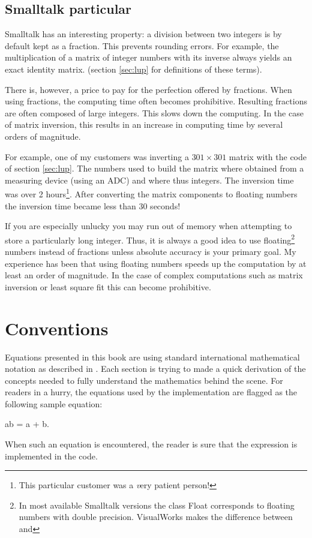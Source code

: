 \subsection{Smalltalk particular}
Smalltalk has an interesting property: a division between two
integers is by default kept as a fraction. This prevents rounding
errors. For example, the multiplication of a matrix of integer
numbers with its inverse always yields an exact identity matrix.
(\cf section \ref{sec:lup} for definitions of these terms).

There is, however, a price to pay for the perfection offered by
fractions. When using fractions, the computing time often becomes
prohibitive. Resulting fractions are often composed of large
integers. This slows down the computing. In the case of matrix
inversion, this results in an increase in computing time by
several orders of magnitude.

For example, one of my customers was inverting a $301\times 301$
matrix with the code of section \ref{sec:lup}. The numbers used to
build the matrix where obtained from a measuring device (using an
ADC) and where thus integers. The inversion time was over 2
hours\footnote{This particular customer was a {\textsl very} patient
person!}. After converting the matrix components to floating
numbers the inversion time became less than 30 seconds!

If you are especially unlucky you may run out of memory when
attempting to store a particularly long integer. Thus, it is
always a good idea to use floating\footnote{In most available
Smalltalk versions the class Float corresponds to floating numbers
with double precision. VisualWorks makes the difference between
 and } numbers instead of fractions unless
absolute accuracy is your primary goal. My experience has been
that using floating numbers speeds up the computation by at least
an order of magnitude.
In the case of complex computations such as
matrix inversion or least square fit this can become prohibitive.

\section{Conventions}
Equations presented in this book are using standard international
mathematical notation as described in \cite{Knuth1}. Each section
is trying to made a quick derivation of the concepts needed to
fully understand the mathematics behind the scene. For readers in
a hurry, the equations used by the implementation are flagged as
the following sample equation:
\begin{mainEquation}
\ln ab = \ln a + \ln b.
\end{mainEquation}
When such an equation is encountered, the reader is sure that the
expression is implemented in the code.

